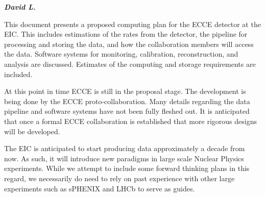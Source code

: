 
\textbf{\emph{David L.}}

This document presents a proposed computing plan for the ECCE detector at the EIC\cite{eic_yellow_report_v1_1}. This includes estimations of the rates from the detector, the pipeline for processing and storing the data, and how the collaboration members will access the data. Software systems for monitoring, calibration, reconstruction, and analysis are discussed. Estimates of the computing and storage requirements are included.

At this point in time ECCE is still in the proposal stage. The development is being done by the ECCE proto-collaboration. Many details regarding the data pipeline and software systems have not been fully fleshed out. It is anticipated that once a formal ECCE collaboration is established that more rigorous designs will be developed. 

The EIC is anticipated to start producing data approximately a decade from now. As such, it will introduce new paradigms in large scale Nuclear Physics experiments. While we attempt to include some forward thinking plans in this regard, we necessarily do need to rely on past experience with other large experiments such as sPHENIX\cite{sphenix_computing_plan_2019} and LHCb\cite{CAMPORAPEREZ2016280} to serve as guides.